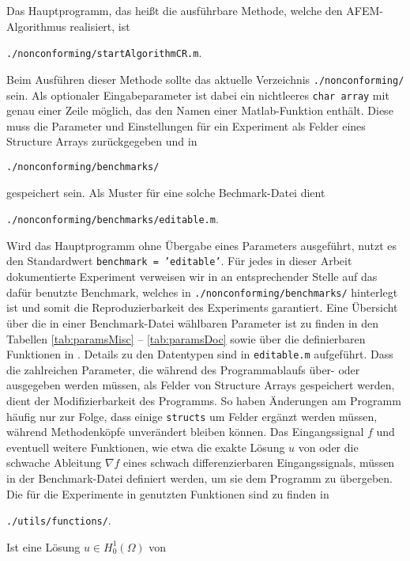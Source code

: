 Das Hauptprogramm, das heißt die ausführbare Methode, welche den
AFEM\--Al\-go\-rith\-mus realisiert, ist
\begin{center}
  \texttt{./nonconforming/startAlgorithmCR.m}.
\end{center}
Beim Ausführen dieser Methode sollte das aktuelle Verzeichnis 
\texttt{./nonconforming/} sein.
Als optionaler Eingabeparameter ist dabei ein nichtleeres \texttt{char array}
mit genau einer Zeile möglich, das den Namen einer Matlab-Funktion enthält. 
Diese muss die Parameter und Einstellungen für ein Experiment als Felder eines
Structure Arrays zurückgegeben und in 
\begin{center}
  \texttt{./nonconforming/benchmarks/}
\end{center}
gespeichert sein.
Als Muster für eine solche Bechmark-Datei dient
\begin{center}
  \texttt{./nonconforming/benchmarks/editable.m}.
\end{center}
Wird das Hauptprogramm ohne Übergabe eines Parameters ausgeführt, nutzt
es den Standardwert \texttt{benchmark = 'editable'}.
Für jedes in dieser Arbeit dokumentierte Experiment verweisen wir in
 an entsprechender Stelle auf das dafür benutzte
Benchmark, welches in \texttt{./nonconforming/benchmarks/} hinterlegt ist und
somit die Reproduzierbarkeit des Experiments garantiert. 
Eine Übersicht über die in einer Benchmark-Datei wählbaren Parameter ist
zu finden in den Tabellen \ref{tab:paramsMisc} -- \ref{tab:paramsDoc}
sowie über die definierbaren Funktionen in .
Details zu den Datentypen sind in \texttt{editable.m} aufgeführt.
Dass die zahlreichen Parameter, die während des Pro\-gramm\-ab\-laufs
über- oder ausgegeben werden müssen, als Felder von
Struc\-ture Ar\-rays gespeichert werden, dient der Modifizierbarkeit des
Programms. 
So haben Änderungen am Programm häufig nur zur Folge, dass einige
\texttt{structs} um Felder ergänzt werden müssen, während Methodenköpfe
unverändert bleiben können.
Das Eingangssignal $f$ und eventuell weitere Funktionen, wie etwa die exakte
Lösung $u$ von  oder die schwache Ableitung
$\nabla f$ eines schwach differenzierbaren Eingangssignals, müssen in der
Benchmark-Datei definiert werden, um sie dem Programm zu übergeben. 
Die für die Experimente in  genutzten Funktionen sind zu
finden in 
\begin{center}
  \texttt{./utils/functions/}.
\end{center}
Ist eine Lösung $u\in H^1_0(\Omega)$ von 
